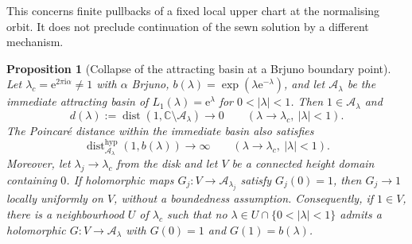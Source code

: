 \documentclass[11pt,a4paper]{article}
\newtheorem{proposition}[theorem]{Proposition}
\theoremstyle{definition}
\newcommand{\eee}{\mathrm{e}}
\newcommand{\ii}{\mathrm{i}}
\begin{document}
This concerns finite pullbacks of a fixed local upper chart at the
normalising orbit.  It does not preclude continuation of the sewn
solution by a different mechanism.

\begin{proposition}[Collapse of the attracting basin at a Brjuno boundary point]
\label{prop:basin-inradius}
Let $\lambda_c=\eee^{2\pi\ii\alpha}\ne1$ with $\alpha$ Brjuno,
$b(\lambda)=\exp(\lambda\eee^{-\lambda})$, and let
$\mathcal A_\lambda$ be the immediate attracting basin of
$L_1(\lambda)=\eee^\lambda$ for $0<|\lambda|<1$.  Then
$1\in\mathcal A_\lambda$ and
\[
 d(\lambda):=\operatorname{dist}
       (1,\mathbb C\setminus\mathcal A_\lambda)
 \longrightarrow0
 \qquad(\lambda\to\lambda_c,\ |\lambda|<1).
\]
The Poincar\'e distance within the immediate basin also satisfies
\[
 \operatorname{dist}^{\mathrm{hyp}}_{\mathcal A_\lambda}
       (1,b(\lambda))\longrightarrow\infty
 \qquad(\lambda\to\lambda_c,\ |\lambda|<1).
\]
Moreover, let $\lambda_j\to\lambda_c$ from the disk and let $V$ be a
connected height domain containing $0$.  If holomorphic maps
$G_j:V\to\mathcal A_{\lambda_j}$ satisfy $G_j(0)=1$, then
$G_j\to1$ locally uniformly on $V$, without a boundedness assumption.
Consequently, if $1\in V$, there is a neighbourhood $U$ of $\lambda_c$
such that no $\lambda\in U\cap\{0<|\lambda|<1\}$ admits a holomorphic
$G:V\to\mathcal A_\lambda$ with $G(0)=1$ and $G(1)=b(\lambda)$.
\end{proposition}
\end{document}
